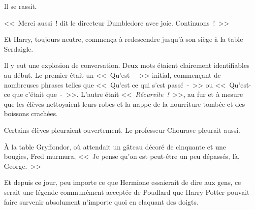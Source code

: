 Il se rassit.

<<~Merci aussi~! dit le directeur Dumbledore avec joie. Continuons~!~>>

Et Harry, toujours neutre, commença à redescendre jusqu'à son siège à la table Serdaigle.

Il y eut une explosion de conversation. Deux mots étaient clairement identifiables au début. Le premier était un <<~Qu'est~-~>> initial, commençant de nombreuses phrases telles que <<~Qu'est ce qui s'est passé~-~>> ou <<~Qu'est-ce que c'était que~-~>>. L'autre était <<~\emph{Récurvite~!}~>>, au fur et à mesure que les élèves nettoyaient leurs robes et la nappe de la nourriture tombée et des boissons crachées.

Certains élèves pleuraient ouvertement. Le professeur Chourave pleurait aussi.

À la table Gryffondor, où attendait un gâteau décoré de cinquante et une bougies, Fred murmura, <<~Je pense qu'on est peut-être un peu dépassés, là, George.~>>

Et depuis ce jour, peu importe ce que Hermione essaierait de dire aux gens, ce serait une légende communément acceptée de Poudlard que Harry Potter pouvait faire survenir absolument n'importe quoi en claquant des doigts.~
